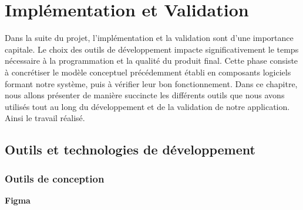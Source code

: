 




\chapter{Implémentation et Validation}
\pagestyle{chapterstyle}
Dans la suite du projet, l'implémentation et la validation 
sont d'une importance capitale. Le choix des outils de 
développement impacte significativement le temps nécessaire à 
la programmation et la qualité du produit final. Cette phase 
consiste à concrétiser le modèle conceptuel précédemment établi 
en composants logiciels formant notre système, puis à vérifier 
leur bon fonctionnement. Dans ce chapitre, nous allons présenter 
de manière succincte les différents outils que nous avons utilisés 
tout au long du développement et de la validation de notre 
application.
Ainsi le travail réalisé.

\newpage
\vspace{1cm}

\section{Outils et technologies de développement}
\subsection{Outils de conception}

\large 
\textbf{Figma}

